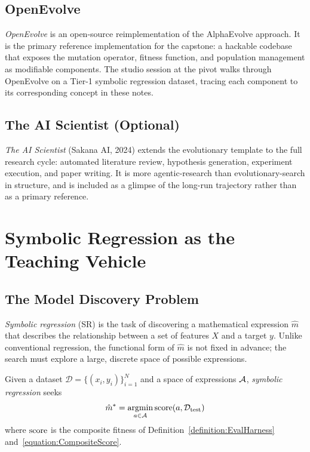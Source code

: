 \subsection{OpenEvolve}

\emph{OpenEvolve} is an open-source reimplementation of the AlphaEvolve approach.
It is the primary reference implementation for the capstone: a hackable codebase that exposes the mutation operator, fitness function, and population management as modifiable components.
The studio session at the pivot walks through OpenEvolve on a Tier-1 symbolic regression dataset, tracing each component to its corresponding concept in these notes.

\subsection{The AI Scientist (Optional)}

\emph{The AI Scientist} (Sakana AI, 2024) extends the evolutionary template to the full research cycle: automated literature review, hypothesis generation, experiment execution, and paper writing.
It is more agentic-research than evolutionary-search in structure, and is included as a glimpse of the long-run trajectory rather than as a primary reference.

\section{Symbolic Regression as the Teaching Vehicle}
\label{section:SymbolicRegression}

\subsection{The Model Discovery Problem}

\emph{Symbolic regression} (SR) is the task of discovering a mathematical expression $\hat{m}$ that describes the relationship between a set of features $X$ and a target $y$.
Unlike conventional regression, the functional form of $\hat{m}$ is not fixed in advance; the search must explore a large, discrete space of possible expressions.

\begin{definition}
\label{definition:SymbolicRegression}
Given a dataset $\mathcal{D} = \{(x_i, y_i)\}_{i=1}^{N}$ and a space of expressions $\mathcal{A}$, \emph{symbolic regression} seeks
\begin{equation}
\hat{m}^* = \operatorname*{argmin}_{a \in \mathcal{A}} \mathrm{score}(a, \mathcal{D}_{\mathrm{test}})
\end{equation}
where $\mathrm{score}$ is the composite fitness of Definition~\ref{definition:EvalHarness} and~\eqref{equation:CompositeScore}.
\end{definition}

